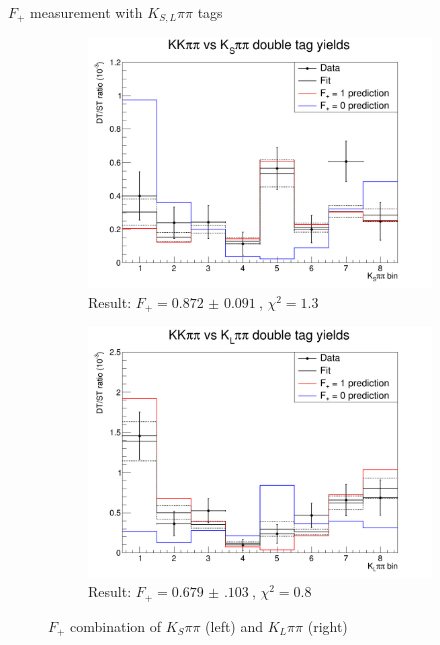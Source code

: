 \documentclass{beamer}
\begin{document}
\begin{frame}{$F_+$ measurement with $K_{S, L}\pi\pi$ tags}
  \begin{figure}
    \centering
    \vspace{-0.2cm}
    \begin{subfigure}{0.50\textwidth}
      \includegraphics[width = 1.0\textwidth]{Plots/CPeven_fraction_combination_KSpipi.png}
      \caption{Result: $F_+ = \SI{0.872(91)}{}$, $\chi^2 = 1.3$}
    \end{subfigure}%
    \begin{subfigure}{0.50\textwidth}
      \includegraphics[width = 1.0\textwidth]{Plots/CPeven_fraction_combination_KLpipi.png}
      \caption{Result: $F_+ = \SI{0.679(103)}{}$, $\chi^2 = 0.8$}
    \end{subfigure}
    \caption{$F_+$ combination of $K_S\pi\pi$ (left) and $K_L\pi\pi$ (right)}
  \end{figure}
\end{frame}
\end{document}

